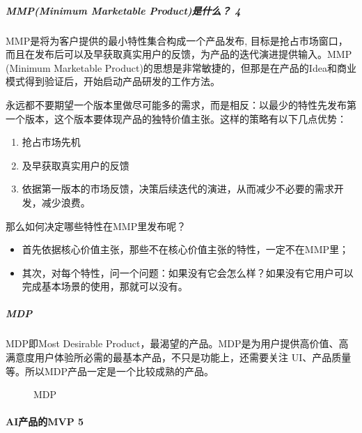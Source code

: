 \documentclass[letterpaper,11pt,english]{sphinxmanual}
\begin{document}
\subparagraph{MMP(Minimum Marketable Product)是什么？ 4\sphinxfootnotemark[550]}
\label{\detokenize{chapter_knowledge/MVP:mmp-minimum-marketable-product-4}}%
\begin{footnotetext}[550]\sphinxAtStartFootnote
{}
%
\end{footnotetext}\ignorespaces 
MMP是将为客户提供的最小特性集合构成一个产品发布,
目标是抢占市场窗口，而且在发布后可以及早获取真实用户的反馈，为产品的迭代演进提供输入。MMP
(Minimum Marketable
Product)的思想是非常敏捷的，但那是在产品的Idea和商业模式得到验证后，开始启动产品研发的工作方法。

永远都不要期望一个版本里做尽可能多的需求，而是相反：以最少的特性先发布第一个版本，这个版本要体现产品的独特价值主张。这样的策略有以下几点优势：
\begin{enumerate}
%
\item {} 
抢占市场先机

\item {} 
及早获取真实用户的反馈

\item {} 
依据第一版本的市场反馈，决策后续迭代的演进，从而减少不必要的需求开发，减少浪费。

\end{enumerate}

那么如何决定哪些特性在MMP里发布呢？
\begin{itemize}
\item {} 
首先依据核心价值主张，那些不在核心价值主张的特性，一定不在MMP里；

\item {} 
其次，对每个特性，问一个问题：如果没有它会怎么样？如果没有它用户可以完成基本场景的使用，那就可以没有。

\end{itemize}


\subparagraph{MDP}
\label{\detokenize{chapter_knowledge/MVP:mdp}}
MDP即Most Desirable
Product，最渴望的产品。MDP是为用户提供高价值、高满意度用户体验所必需的最基本产品，不只是功能上，还需要关注
UI、产品质量等。所以MDP产品一定是一个比较成熟的产品。

\begin{figure}[H]
\centering
\capstart

\noindent{}
\caption{MDP}\label{\detokenize{chapter_knowledge/MVP:id11}}\end{figure}


\paragraph{AI产品的MVP 5\sphinxfootnotemark[551]}
\label{\detokenize{chapter_knowledge/MVP:aimvp-5}}%
\begin{footnotetext}[551]\sphinxAtStartFootnote
{}
%
\end{footnotetext}\ignorespaces 
\end{document}

